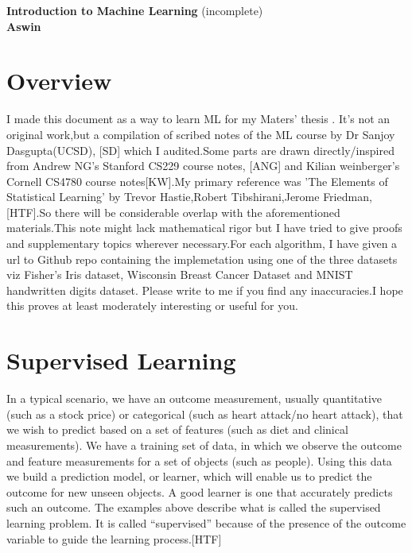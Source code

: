 \documentclass[12pt]{article}
\begin{document}
	
	   
	     
	
		\enlargethispage{2cm}
		
		\begin{center}
			
			\vspace*{-1cm}
			
			\textbf{\Large Introduction to Machine Learning     }(incomplete)\\[10pt]
			

\textbf{\Large Aswin}\\ [8pt]			
			
			\end{center}
		
\cleardoublepage

\tableofcontents
\newpage

\section{Overview}

I made this document as a way to learn ML for my Maters' thesis . It’s not an original work,but a compilation of scribed notes of the ML course by Dr Sanjoy Dasgupta(UCSD), [SD] which I audited.Some parts are drawn directly/inspired from Andrew NG's Stanford CS229 course notes, [ANG] and Kilian weinberger's Cornell CS4780 course notes[KW].My primary reference was 'The Elements of Statistical Learning' by Trevor Hastie,Robert Tibshirani,Jerome Friedman, [HTF].So there will be considerable overlap with the aforementioned materials.This note might lack mathematical rigor but I have tried to give proofs and supplementary topics wherever necessary.For each algorithm, I have given a url to Github repo containing the implemetation using one of the three datasets viz Fisher's Iris dataset, Wisconsin Breast Cancer Dataset and MNIST handwritten digits dataset.
Please write to me if you find any inaccuracies.I hope this   proves at least moderately
interesting or useful for you.

\cleardoublepage

\section{Supervised Learning}

	In a typical scenario, we have an outcome measurement, usually quantitative (such as a stock price) or
categorical (such as heart attack/no heart attack), that we wish to predict
based on a set of features (such as diet and clinical measurements). We
have a training set of data, in which we observe the outcome and feature
measurements for a set of objects (such as people). Using this data we build
a prediction model, or learner, which will enable us to predict the outcome
for new unseen objects. A good learner is one that accurately predicts such
an outcome.
The examples above describe what is called the supervised learning problem. It is called “supervised” because of the presence of the outcome variable to guide the learning process.[HTF]
\end{document}

